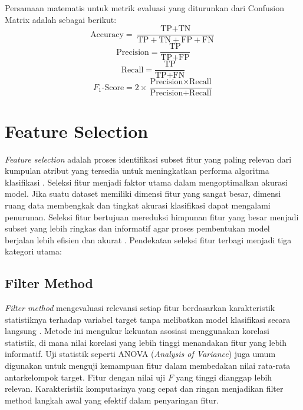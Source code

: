 \documentclass[a4paper,oneside,12pt]{report}
\begin{document}
Persamaan matematis untuk metrik evaluasi yang diturunkan dari Confusion Matrix adalah sebagai berikut:
\begin{equation}
    \text{Accuracy} = \frac{\text{TP} + \text{TN}}{\text{TP} + \text{TN} + \text{FP} + \text{FN}}
\end{equation}
\begin{equation}
    \text{Precision} = \frac{\text{TP}}{\text{TP} + \text{FP}}
\end{equation}
\begin{equation}
    \text{Recall} = \frac{\text{TP}}{\text{TP} + \text{FN}}
\end{equation}
\begin{equation}
    F_1\text{-Score} = 2 \times \frac{\text{Precision} \times \text{Recall}}{\text{Precision} + \text{Recall}}
\end{equation}

\section{Feature Selection}
\textit{Feature selection} adalah proses identifikasi subset fitur yang paling relevan dari kumpulan atribut yang tersedia untuk meningkatkan performa algoritma klasifikasi \cite{ref_pratama}. Seleksi fitur menjadi faktor utama dalam mengoptimalkan akurasi model. Jika suatu dataset memiliki dimensi fitur yang sangat besar, dimensi ruang data membengkak dan tingkat akurasi klasifikasi dapat mengalami penurunan. Seleksi fitur bertujuan mereduksi himpunan fitur yang besar menjadi subset yang lebih ringkas dan informatif agar proses pembentukan model berjalan lebih efisien dan akurat \cite{ref_septiana}. Pendekatan seleksi fitur terbagi menjadi tiga kategori utama:

\subsection{Filter Method}
\textit{Filter method} mengevaluasi relevansi setiap fitur berdasarkan karakteristik statistiknya terhadap variabel target tanpa melibatkan model klasifikasi secara langsung \cite{ref_guyon}. Metode ini mengukur kekuatan asosiasi menggunakan korelasi statistik, di mana nilai korelasi yang lebih tinggi menandakan fitur yang lebih informatif. Uji statistik seperti ANOVA (\textit{Analysis of Variance}) juga umum digunakan untuk menguji kemampuan fitur dalam membedakan nilai rata-rata antarkelompok target. Fitur dengan nilai uji $F$ yang tinggi dianggap lebih relevan. Karakteristik komputasinya yang cepat dan ringan menjadikan filter method langkah awal yang efektif dalam penyaringan fitur.
\end{document}
